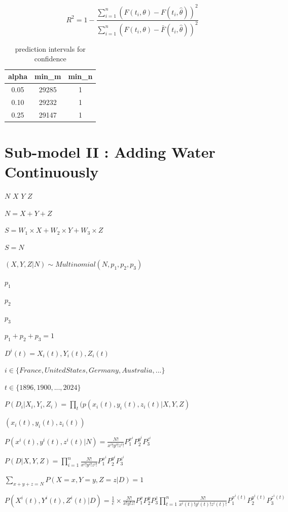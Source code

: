 \documentclass{mcmthesis}
\begin{document}
\begin{equation}
R^{2} = 1 - \frac{\sum_{i = 1}^{n}(F(t_{i}, \theta ) - F(t_{i}, \hat{\theta }))^2}{\sum_{i = 1}^{n}(F(t_{i}, \theta ) - \bar{F}(t_{i}, \hat{\theta }))^2}
\end{equation}


\begin{table}
\centering
\caption{prediction intervals for confidence}
\begin{tabular}{ccc} 
\toprule
alpha & min\_m & min\_n  \\ 
\toprule
0.05  & 29285  & 1       \\
0.10  & 29232  & 1       \\
0.25  & 29147  & 1       \\
\toprule
\end{tabular}
\end{table}

\section{Sub-model II : Adding Water Continuously}
$N$ $X$ $Y$ $Z$

$N=X+Y+Z$

$S=W_{1}\times X+W_{2}\times Y+W_{3}\times Z$

$S=N$

$(X, Y, Z|N)\sim Multinomial(N, p_{1}, p_{2}, p_{3})$

$p_{1}$

$p_{2}$

$p_{3}$

$p_{1}+p_{2}+p_{3}=1$

$D^i(t)={X_{i}(t), Y_{i}(t), Z_{i}(t)}$

$i\in \{France, United States, Germany, Australia, ...\}$

$t\in \{1896, 1900, ...,2024\}$

$P(D_{i}|X_{i}, Y_{i}, Z_{i})= \prod_{t}(p(x_{i}(t), y_{i}(t), z_{i}(t)|X, Y, Z)$

$(x_{i}(t), y_{i}(t), z_{i}(t))$

$P(x^{i}(t), y^{i}(t), z^{i}(t)|N)=\frac{N!}{x^{i}!y^{i}!z^{i}!}P_{1} ^{x^{i}}P_{2} ^ {y^{i}}P_{3} ^ {z^{i}}$

$P(D|X, Y, Z)=\prod_{i=1}^{n}\frac{N!}{x^{i}!y^{i}!z^{i}!}P_{1}^{x^{i}}P_{2}^{y^{i}}P_{3}^{z^{i}}$

$\sum_{x+y+z=N}P(X=x, Y=y, Z=z|D)=1$

$P(X^{i}(t), Y^{i}(t), Z^{i}(t)|D) = \frac{1}{c} \times \frac{N!}{x!y!z!}P_{1}^{x}P_{2}^{y}P_{3}^{z}\prod_{t=1}^{n}\frac{N!}{x^{i}(t)!y^{i}(t)!z^{i}(t)!}P_{1}^{x^{i}(t)}P_{2}^{y^{i}(t)}P_{3}^{z^{i}(t)}$
\end{document}
